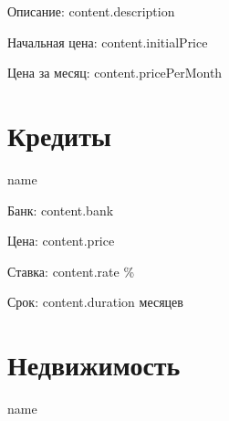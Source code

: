 \documentclass[a4paper,12pt]{article}
\begin{document}
{{{{{{{{{      Описание: {{ content.description }}
      
      Начальная цена: {{ content.initialPrice }}
      
      Цена за месяц: {{ content.pricePerMonth }}
    {%
  {%
{%

{%
  \section{Кредиты}
  {%
      {{ name }}

      Банк: {{ content.bank }}
      
      Цена: {{ content.price }}
      
      Ставка: {{ content.rate }} \%

      Срок: {{ content.duration }} месяцев
  {%
{%

{%
  \section{Недвижимость}
  {%
    {{ name }}

}}}}}}}}}}}}}}}}}}
\end{document}
